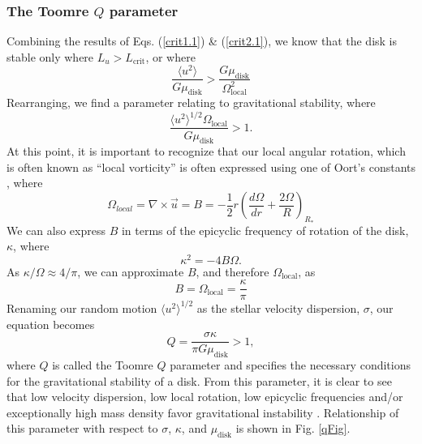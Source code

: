 \documentclass[aps,pra,twocolumn]{revtex4-1}
\begin{document}
\subsubsection{\label{section 3.1.3} The Toomre $Q$ parameter}
Combining the results of Eqs. (\ref{crit1.1}) \& (\ref{crit2.1}), we know that the disk is stable only where $L_u > L_\text{crit}$, or where
\begin{equation}
\frac{\langle u^2 \rangle}{G\mu_\text{disk}} > \frac{G \mu_\text{disk}}{\Omega_\text{local}^2} \nonumber
\end{equation}
Rearranging, we find a parameter relating to gravitational stability, where \cite{whittle2010}
\begin{equation}
\frac{\langle u^2 \rangle^{1/2} \Omega_\text{local}}{G\mu_\text{disk}} > 1.
\end{equation}
At this point, it is important to recognize that our local angular rotation, which is often known as ``local vorticity'' is often expressed using one of Oort's constants \cite{whittle2010}, where
\begin{equation}
\Omega_{local} = \nabla \times \vec{u} = B = -\frac{1}{2}r\left(\frac{d\Omega}{dr} + \frac{2\Omega}{R}  \right)_{R_*}
\end{equation}
We can also express $B$ in terms of the epicyclic frequency of rotation of the disk, $\kappa$, where \cite{whittle2010}
\begin{equation}
\kappa^2 = -4B\Omega.
\end{equation}
As $\kappa/\Omega \approx 4/\pi$, we can approximate $B$, and therefore $\Omega_\text{local}$, as
\begin{equation}
B = \Omega_\text{local} = \frac{\kappa}{\pi}
\end{equation}
Renaming our random motion $\langle u^2 \rangle ^{1/2}$ as the stellar velocity dispersion, $\sigma$, our equation becomes
\begin{equation}
Q = \frac{\sigma \kappa}{\pi G\mu_\text{disk}} > 1, \label{qParam}
\end{equation}
where $Q$ is called the Toomre $Q$ parameter and specifies the necessary conditions for the gravitational stability of a disk.  From this parameter, it is clear to see that low velocity dispersion, low local rotation, low epicyclic frequencies and/or exceptionally high mass density favor gravitational instability \cite{whittle2010}.  Relationship of this parameter with respect to $\sigma$, $\kappa$, and $\mu_\text{disk}$ is shown in Fig. \ref{qFig}.
\end{document}
